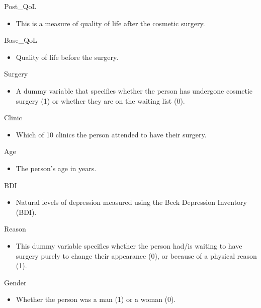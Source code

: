 \documentclass[
]{article}
\providecommand{\tightlist}{%
  \setlength{\itemsep}{0pt}\setlength{\parskip}{0pt}}
\begin{document}
Post\_QoL

\begin{itemize}
\tightlist
\item
  This is a measure of quality of life after the cosmetic surgery.
\end{itemize}

Base\_QoL

\begin{itemize}
\tightlist
\item
  Quality of life before the surgery.
\end{itemize}

Surgery

\begin{itemize}
\tightlist
\item
  A dummy variable that specifies whether the person has undergone
  cosmetic surgery (1) or whether they are on the waiting list (0).
\end{itemize}

Clinic

\begin{itemize}
\tightlist
\item
  Which of 10 clinics the person attended to have their surgery.
\end{itemize}

Age

\begin{itemize}
\tightlist
\item
  The person's age in years.
\end{itemize}

BDI

\begin{itemize}
\tightlist
\item
  Natural levels of depression measured using the Beck Depression
  Inventory (BDI).
\end{itemize}

Reason

\begin{itemize}
\tightlist
\item
  This dummy variable specifies whether the person had/is waiting to
  have surgery purely to change their appearance (0), or because of a
  physical reason (1).
\end{itemize}

Gender

\begin{itemize}
\tightlist
\item
  Whether the person was a man (1) or a woman (0).
\end{itemize}
\end{document}
